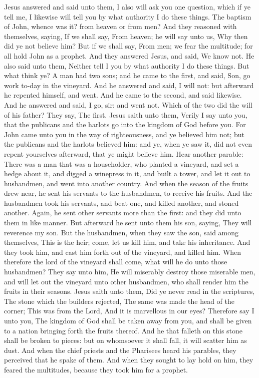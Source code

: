 Jesus answered and said unto them, I also will ask you one question, which if ye tell me, I likewise will tell you by what authority I do these things. The baptism of John, whence was it? from heaven or from men? And they reasoned with themselves, saying, If we shall say, From heaven; he will say unto us, Why then did ye not believe him? But if we shall say, From men; we fear the multitude; for all hold John as a prophet. And they answered Jesus, and said, We know not. He also said unto them, Neither tell I you by what authority I do these things. But what think ye? A man had two sons; and he came to the first, and said, Son, go work to-day in the vineyard. And he answered and said, I will not: but afterward he repented himself, and went. And he came to the second, and said likewise. And he answered and said, I go, sir: and went not. Which of the two did the will of his father? They say, The first. Jesus saith unto them, Verily I say unto you, that the publicans and the harlots go into the kingdom of God before you. For John came unto you in the way of righteousness, and ye believed him not; but the publicans and the harlots believed him: and ye, when ye saw it, did not even repent yourselves afterward, that ye might believe him.  Hear another parable: There was a man that was a householder, who planted a vineyard, and set a hedge about it, and digged a winepress in it, and built a tower, and let it out to husbandmen, and went into another country. And when the season of the fruits drew near, he sent his servants to the husbandmen, to receive his fruits. And the husbandmen took his servants, and beat one, and killed another, and stoned another. Again, he sent other servants more than the first: and they did unto them in like manner. But afterward he sent unto them his son, saying, They will reverence my son. But the husbandmen, when they saw the son, said among themselves, This is the heir; come, let us kill him, and take his inheritance. And they took him, and cast him forth out of the vineyard, and killed him. When therefore the lord of the vineyard shall come, what will he do unto those husbandmen? They say unto him, He will miserably destroy those miserable men, and will let out the vineyard unto other husbandmen, who shall render him the fruits in their seasons. Jesus saith unto them, Did ye never read in the scriptures, The stone which the builders rejected, The same was made the head of the corner; This was from the Lord, And it is marvellous in our eyes?  Therefore say I unto you, The kingdom of God shall be taken away from you, and shall be given to a nation bringing forth the fruits thereof. And he that falleth on this stone shall be broken to pieces: but on whomsoever it shall fall, it will scatter him as dust. And when the chief priests and the Pharisees heard his parables, they perceived that he spake of them. And when they sought to lay hold on him, they feared the multitudes, because they took him for a prophet. 

